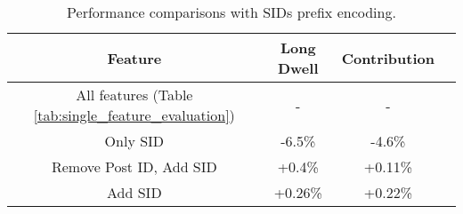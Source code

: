 \begin{table}[ht]
\centering
\small
\label{tab:GR SID performance}
\begin{tabular}{c c c c}
\toprule
\textbf{Feature} & \textbf{Long Dwell} & \textbf{Contribution} \\ 
\midrule
All features (Table \ref{tab:single_feature_evaluation}) & - & - \\ 
Only SID & -6.5\% & -4.6\% \\
Remove Post ID, Add SID & +0.4\% & +0.11\% \\
Add SID & +0.26\% & +0.22\%  \\

\midrule

\end{tabular}
\caption{Performance comparisons with SIDs prefix encoding.}
\vspace{-2.0em}
\end{table}



